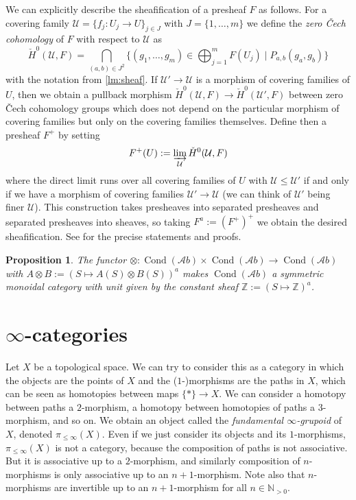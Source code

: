 \documentclass[11pt,A4]{article}
\theoremstyle{plain}
\newtheorem{prop}[thm]{Proposition}
\theoremstyle{definition}
\theoremstyle{remark}
\newcommand{\N}{\mathbb{N}}
\newcommand{\Z}{\mathbb{Z}}
\newcommand{\1}{\mathbbm{1}}
\newcommand{\Ab}{\mathscr{A}b}
\DeclareMathOperator{\Cond}{Cond}
\newcommand{\ot}{\otimes}
\begin{document}
We can explicitly describe the sheafification of a presheaf $F$ as follows.
For a covering family $\mathcal{U}=\{f_{j}\colon U_{j}\to U\}_{j\in J}$ with $J=\{1,\ldots,m\}$ we define the \textit{zero \v{C}ech cohomology} of $F$ with respect to $\mathcal{U}$ as
\[ \check{H}^{0}(\mathcal{U},F)=\bigcap_{(a,b)\in J^{2}} \{ (g_{1},\ldots,g_{m})\in \bigoplus_{j=1}^{m}F(U_{j}) \mid P_{a,b}(g_{a},g_{b})\} \]
with the notation from \cref{lm:sheaf}.
If $\mathcal{U}'\to \mathcal{U}$ is a morphism of covering families of $U$, then we obtain a pullback morphism $\check{H}^{0}(\mathcal{U},F)\to \check{H}^{0}(\mathcal{U}',F)$ between zero \v{C}ech cohomology groups which does not depend on the particular morphism of covering families but only on the covering families themselves.
Define then a presheaf $F^{+}$ by setting
\[ F^{+}(U):=\varinjlim_{\mathcal{U}} \check{H}^{0}(\mathcal{U},F) \]
where the direct limit runs over all covering families of $U$ with $\mathcal{U}\leqslant \mathcal{U'}$ if and only if we have a morphism of covering families $\mathcal{U'}\to \mathcal{U}$ (we can think of $\mathcal{U'}$ being finer $\mathcal{U}$).
This construction takes presheaves into separated presheaves and separated presheaves into sheaves, so taking $F^{a}:=(F^{+})^{+}$ we obtain the desired sheafification.
See \cite[\href{https://stacks.math.columbia.edu/tag/03NQ}{Tag 03NQ}]{sta19} for the precise statements and proofs.

\begin{prop}\label{prop:sm}
    The functor $\ot\colon \Cond(\Ab)\times \Cond(\Ab)\to \Cond(\Ab)$ with $A\ot B:=(S\mapsto A(S)\ot B(S))^{a}$ makes $\Cond(\Ab)$ a symmetric monoidal category with unit given by the constant sheaf $\Z:=(S\mapsto \Z)^{a}$.
\end{prop}

\section{$\infty$-categories}

Let $X$ be a topological space.
We can try to consider this as a category in which the objects are the points of $X$ and the ($1$-)morphisms are the paths in $X$, which can be seen as homotopies between maps $\{ *\}\to X$.
We can consider a homotopy between paths a $2$-morphism, a homotopy between homotopies of paths a $3$-morphism, and so on.
We obtain an object called the \textit{fundamental $\infty$-grupoid} of $X$, denoted $\pi_{\leqslant \infty}(X)$.
Even if we just consider its objects and its $1$-morphisms, $\pi_{\leqslant \infty }(X)$ is not a category, because the composition of paths is not associative.
But it is associative up to a $2$-morphism, and similarly composition of $n$-morphisms is only associative up to an $n+1$-morphism.
Note also that $n$-morphisms are invertible up to an $n+1$-morphism for all $n\in \N_{>0}$.
\end{document}
